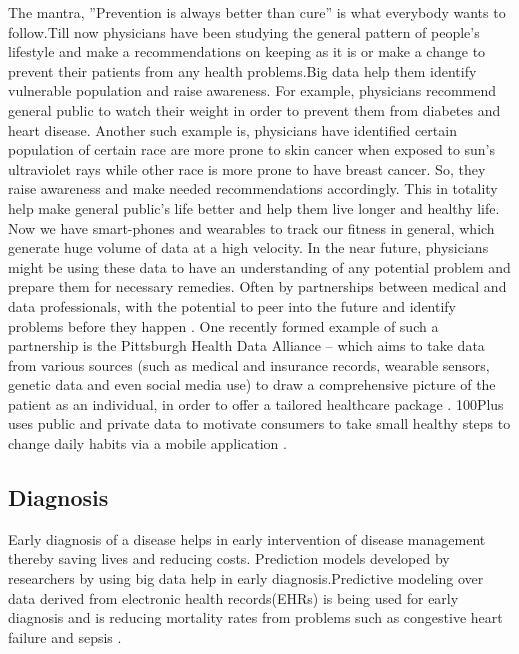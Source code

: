 \documentclass[sigconf]{acmart}
\begin{document}
The mantra, ''Prevention is always better than cure'' is what everybody
wants to follow.Till now physicians have been studying the general pattern of people's lifestyle and make a recommendations on keeping as it is or make a change to prevent their patients from any health problems.Big data help them identify vulnerable population and raise awareness. For example, physicians recommend general public to watch their weight in order to prevent them from diabetes and heart disease. Another such example is, physicians have identified certain population of certain race are more prone to skin cancer when exposed to sun's ultraviolet rays while other race is more prone to have breast cancer. So, they raise awareness and make needed recommendations accordingly. This in totality help make general public's life better and help them live longer and healthy life. Now we have smart-phones and wearables to track our fitness in general, which generate huge volume of data at a high velocity. In the near future, physicians might be using these data to have an understanding of any potential problem and prepare them for necessary remedies. Often by partnerships between medical and data professionals, with the potential to peer into the future and identify problems before they happen \cite{www-forbes-com}. One recently formed example of such a partnership is the Pittsburgh Health Data Alliance -- which aims to take data from various sources (such as medical and insurance records, wearable sensors, genetic data and even social media use) to draw a comprehensive picture of the patient as an individual, in order to offer a tailored healthcare package \cite{www-forbes-com}. 100Plus uses public and private data to motivate consumers to take small healthy steps to change daily habits via a mobile application \cite{www-ghdonline-org}.  

 

\subsection{Diagnosis}
Early diagnosis of a disease helps in early intervention of disease management thereby saving lives and reducing costs. Prediction models developed by researchers by using big data help in early diagnosis.Predictive modeling over data derived from electronic health records(EHRs) is being used for early diagnosis and is reducing mortality rates from problems such as congestive heart failure and sepsis \cite{www-mapr-com}.
\end{document}
